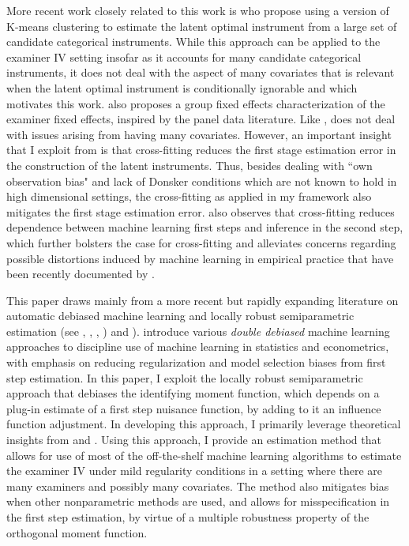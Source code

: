 More recent work closely related to this work is \citet{wiemann2023optimal} who propose using a version of K-means clustering to estimate the latent optimal instrument from a large set of candidate categorical instruments. While this approach can be applied to the examiner IV setting insofar as it accounts for many candidate categorical instruments, it does not deal with the aspect of many covariates that is relevant when the latent optimal instrument is conditionally ignorable and which motivates this work. \citet{jochmans2023many} also proposes a group fixed effects characterization of the examiner fixed effects, inspired by the panel data literature. Like \citet{wiemann2023optimal}, \citet{jochmans2023many} does not deal with issues arising from having many covariates. However, an important insight that I exploit from \citet{jochmans2023many} is that cross-fitting reduces the first stage estimation error in the construction of the latent instruments. Thus, besides dealing with ``own observation bias" and lack of Donsker conditions which are not known to hold in high dimensional settings, the cross-fitting as applied in my framework also mitigates the first stage estimation error. \citet{mikusheva2021many} also observes that cross-fitting reduces dependence between machine learning first steps and inference in the second step, which further bolsters the case for cross-fitting and alleviates concerns regarding possible distortions induced by machine learning in empirical practice that have been recently documented by \citet{angrist2022machine}.

This paper draws mainly from a more recent but rapidly expanding literature on automatic debiased machine learning and locally robust semiparametric estimation (see \citet{chernozhukov2018double}, \citet{chernozhukov2021automatic}, \citet{chernozhukov2022automatic}, \citet{chernozhukov2022debiased}) \citet{chernozhukov2022locally} and \citet{ichimura2022influence}). \citet{chernozhukov2018double} introduce various \textit{double debiased} machine learning approaches to discipline use of machine learning in statistics and econometrics, with emphasis on reducing regularization and model selection biases from first step estimation. In this paper, I exploit the locally robust semiparametric approach that debiases the identifying moment function, which depends on a plug-in estimate of a first step nuisance function, by adding to it an influence function adjustment. In developing this approach, I primarily leverage theoretical insights from \citet{chernozhukov2022locally} and \citet{ichimura2022influence}. Using this approach, I provide an estimation method that allows for use of most of the off-the-shelf machine learning algorithms to estimate the examiner IV under mild regularity conditions in a setting where there are many examiners and possibly many covariates. The method also mitigates bias when other nonparametric methods are used, and allows for misspecification in the first step estimation, by virtue of a multiple robustness property of the orthogonal moment function. 

